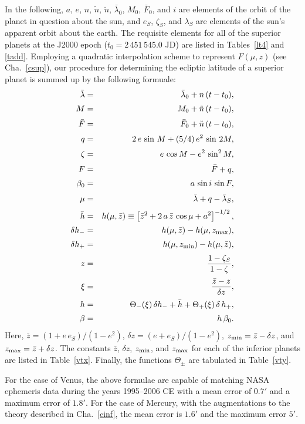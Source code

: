 In the following, $a$, $e$, $n$, $\tilde{n}$, $\breve{n}$, $\bar{\lambda}_0$, $M_0$,  $\bar{F}_0$, and $i$ are  elements of the orbit of the planet in question
about the sun, and $e_S$, $\zeta_S$, and $\lambda_S$  are elements of the sun's apparent orbit
about the earth. 
The requisite elements for all of the superior planets at the J2000 epoch ($t_0=2\,451\,545.0$ JD)
are listed in Tables~\ref{lt4} and \ref{tadd}.
Employing a quadratic interpolation scheme to represent
$F(\mu,z)$ (see Cha.~\ref{csup}), our procedure for determining the ecliptic latitude of a
superior planet is summed up by the following formuale:
\begin{eqnarray}
\bar{\lambda}&=&  \bar{\lambda}_0 + n\,(t-t_0) ,\\[0.5ex]
M &=& M_0  +\tilde{n}\,(t-t_0),\\[0.5ex]
\bar{F} &=& \bar{F}_0 + \breve{n}\,(t-t_0),\\[0.5ex]
q&=& 2\,e\,\sin \,M + (5/4)\,e^2\,\sin\,2M,\\[0.5ex]
\zeta &=& e\,\cos M - e^2\,\sin^2 M,\\[0.5ex]
F &=&\bar{F} + q,\\[0.5ex]
\beta_0  &=& a\,\sin i\,\sin F,\\[0.5ex]
\mu&=& \bar{\lambda}+q-\bar{\lambda}_S,\\[0.5ex]
\bar{h} &=& h(\mu,\bar{z})\equiv\left[\bar{z}^2 + 2\,a\,\bar{z}\,\cos\mu+ a^2\right]^{-1/2},\\[0.5ex]
\delta h_- &=& h(\mu,\bar{z}) - h(\mu,z_{\rm max}),\\[0.5ex]
\delta h_+&=& h(\mu,z_{\rm min}) - h(\mu,\bar{z}),\\[0.5ex]
z &=& \frac{1-\zeta_S}{1-\zeta},\\[0.5ex]
\xi &=& \frac{\bar{z}-z}{\delta z},\\[0.5ex]
h  &=&\Theta_-(\xi)\,\delta h_-+ \bar{h}
+ \Theta_+(\xi)\,\delta\,h_+,\\[0.5ex]
\beta &=& h\,\beta_0.
\end{eqnarray}
Here, $\bar{z} = (1+e\,e_S)/(1-e^{2})$, $\delta z = (e+e_S)/(1-e^{2})$, $z_{\rm min} = \bar{z}-\delta z$,
and $z_{\rm max} = \bar{z}+\delta z$. The constants $\bar{z}$, $\delta z$, $z_{\rm min}$, and $z_{\rm max}$ 
for each of the inferior planets are listed in Table~\ref{vtx}.  Finally, the functions $\Theta_\pm$ are  tabulated in Table~\ref{vty}.

For the case of Venus, the above formulae are capable of matching NASA ephemeris data during the years 1995--2006 CE
with a mean error of $0.7'$ and a maximum error of $1.8'$. For the case of Mercury, with the augmentations to the theory described in Cha.~\ref{cinf}, the mean error is
$1.6'$ and the maximum error $5'$. 

